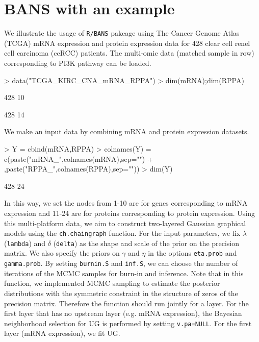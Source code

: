 \documentclass{article}
\begin{document}
\section{BANS with an example}
We illustrate the usage of \texttt{R/BANS} pakcage using The Cancer Genome Atlas (TCGA) mRNA expression and protein expression data for 428 clear cell renel cell carcinoma (ccRCC) patients. The multi-omic data (matched sample in row) corresponding to PI3K pathway can be loaded.
\begin{Schunk}
\begin{Sinput}
> data("TCGA_KIRC_CNA_mRNA_RPPA")
> dim(mRNA);dim(RPPA)
\end{Sinput}
\begin{Soutput}
[1] 428  10
\end{Soutput}
\begin{Soutput}
[1] 428  14
\end{Soutput}
\end{Schunk}
We make an input data by combining mRNA and protein expression datasets.
\begin{Schunk}
\begin{Sinput}
> Y = cbind(mRNA,RPPA)
> colnames(Y) = c(paste("mRNA_",colnames(mRNA),sep="")
+ ,paste("RPPA_",colnames(RPPA),sep=""))
> dim(Y)
\end{Sinput}
\begin{Soutput}
[1] 428  24
\end{Soutput}
\end{Schunk}
In this way, we set the nodes from 1-10 are for genes corresponding to mRNA expression and 11-24 are for proteins corresponding to protein expression. Using this multi-platform data, we aim to construct two-layered Gaussian graphical models using the \texttt{ch.chaingraph} function. For the input parameters, we fix $\lambda$ (\texttt{lambda}) and $\delta$ (\texttt{delta}) as the shape and scale of the prior on the precision matrix. We also specify the priors on $\gamma$ and $\eta$ in the options \texttt{eta.prob} and \texttt{gamma.prob}. By setting \texttt{burnin.S} and \texttt{inf.S}, we can choose the number of iterations of the MCMC samples for burn-in and inference. Note that in this function, we implemented MCMC sampling to estimate the posterior distributions with the symmetric constraint in the structure of zeros of the precision matrix. Therefore the function should run jointly for a layer. For the first layer that has no upstream layer (e.g. mRNA expression), the Bayesian neighborhood selection for UG is performed by setting \texttt{v.pa=NULL}. For the first layer (mRNA expression), we fit UG.
\end{document}
